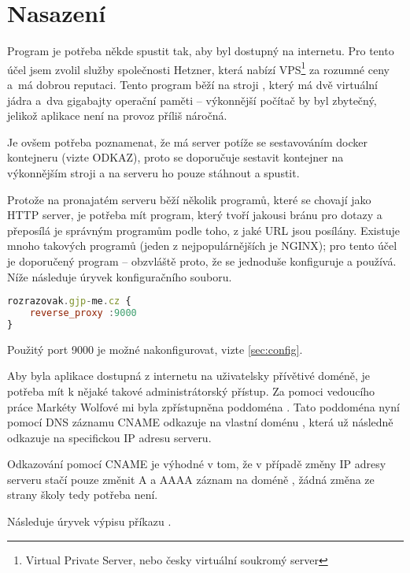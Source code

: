 \hypertarget{Technologie}{\chapter{Nasazení}}

\indent

Program je potřeba někde spustit tak, aby byl dostupný na internetu. Pro tento účel jsem zvolil služby společnosti Hetzner, která nabízí VPS\footnote{Virtual Private Server, nebo česky virtuální soukromý server} za rozumné ceny a~má dobrou reputaci. Tento program běží na stroji , který má dvě virtuální jádra a~dva gigabajty operační paměti -- výkonnější počítač by byl zbytečný, jelikož aplikace není na provoz příliš náročná.

Je ovšem potřeba poznamenat, že má server potíže se sestavováním docker kontejneru (vizte ODKAZ), proto se doporučuje sestavit kontejner na výkonnějším stroji a na serveru ho pouze stáhnout a spustit. 

Protože na pronajatém serveru běží několik programů, které se chovají jako HTTP server, je potřeba mít program, který tvoří jakousi bránu pro dotazy a přeposílá je správným programům podle toho, z jaké URL jsou posílány. Existuje mnoho takových programů (jeden z nejpopulárnějších je NGINX); pro tento účel je doporučený program  -- obzvláště proto, že se jednoduše konfiguruje a používá. Níže následuje úryvek konfiguračního souboru. 

\begin{lstlisting}[language=JavaScript,caption={Úryvek konfiguračního souboru Caddy}]
rozrazovak.gjp-me.cz {
    reverse_proxy :9000
}
\end{lstlisting}

Použitý port 9000 je možné nakonfigurovat, vizte \ref{sec:config}.

Aby byla aplikace dostupná z internetu na uživatelsky přívětivé doméně, je potřeba mít k nějaké takové administrátorský přístup. Za pomoci vedoucího práce Markéty Wolfové mi byla zpřístupněna poddoména . Tato poddoména nyní pomocí DNS záznamu CNAME odkazuje na vlastní doménu , která už následně odkazuje na specifickou IP adresu serveru. 

Odkazování pomocí CNAME je výhodné v tom, že v případě změny IP adresy serveru stačí pouze změnit A a AAAA záznam na doméně , žádná změna ze strany školy tedy potřeba není.

Následuje úryvek výpisu příkazu .

